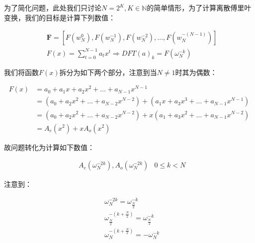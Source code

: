\documentclass[UTF8]{book}
\begin{document}
为了简化问题，此处我们只讨论$N=2^K, K\in \mathbb{N}$的简单情形，为了计算离散傅里叶变换，我们的目标是计算下列数值：
\begin{large}
    \begin{equation}
        \begin{aligned}
            &\mathbf{F}=\left [ F(w_N^{0}), F(w_N^{-1}), F(w_N^{-2}), \dots, F(w_N^{-(N-1)}) \right ] \\
            &F(x)=\sum_{t=0}^{N-1}a_tx^t \Rightarrow DFT(a)_k=F(\omega_N^{-k})
            \nonumber
        \end{aligned}
    \end{equation}
\end{large}
我们将函数$F(x)$拆分为如下两个部分，注意到当$N\not = 1$时其为偶数：
\begin{large}
    \begin{equation}
        \begin{aligned}
            F(x) &= a_0+a_1x+a_2x^2+\dots +a_{N-1}x^{N-1} \\
            &= (a_0+a_2x^2+\dots +a_{N-2}x^{N-2})+(a_1x+a_3x^3+\dots +a_{N-1}x^{N-1}) \\
            &= (a_0+a_2x^2+\dots +a_{N-2}x^{N-2})+x(a_1+a_3x^2+\dots +a_{N-1}x^{N-2}) \\
            &= A_{e}(x^2)+xA_{o}(x^2)
            \nonumber
        \end{aligned}
    \end{equation}
\end{large}
故问题转化为计算如下数值：
\begin{large}
    \begin{equation}
        \begin{aligned}
            &A_{e}(\omega_N^{-2k}), A_{o}(\omega_N^{-2k}) & 0 \le k <N
            \nonumber
        \end{aligned}
    \end{equation}
\end{large}
注意到：
\begin{large}
    \begin{equation}
        \begin{aligned}
            &\omega_N^{-2k}=\omega_{\frac{N}{2}}^{-k} \\
            &\omega_{\frac{N}{2}}^{-(k+\frac{N}{2})}=\omega_{\frac{N}{2}}^{-k} \\
            &\omega_{N}^{-(k+\frac{N}{2})}=-\omega_{N}^{-k}
            \nonumber
        \end{aligned}
    \end{equation}
\end{large}
\end{document}
